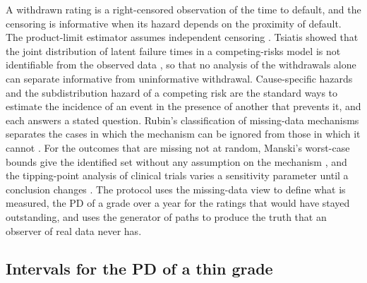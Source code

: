 A withdrawn rating is a right-censored observation of the time to default, and the censoring is informative when its hazard depends on the proximity of default. The product-limit estimator assumes independent censoring \citep{Kaplan_1958}. Tsiatis showed that the joint distribution of latent failure times in a competing-risks model is not identifiable from the observed data \citep{Tsiatis_1975}, so that no analysis of the withdrawals alone can separate informative from uninformative withdrawal. Cause-specific hazards \citep{Prentice_1978} and the subdistribution hazard of a competing risk \citep{Fine_1999} are the standard ways to estimate the incidence of an event in the presence of another that prevents it, and each answers a stated question. Rubin's classification of missing-data mechanisms separates the cases in which the mechanism can be ignored from those in which it cannot \citep{Rubin_1976,Little_2019}. For the outcomes that are missing not at random, Manski's worst-case bounds give the identified set without any assumption on the mechanism \citep{Manski_1989}, and the tipping-point analysis of clinical trials varies a sensitivity parameter until a conclusion changes \citep{Cro_2020}. The protocol uses the missing-data view to define what is measured, the PD of a grade over a year for the ratings that would have stayed outstanding, and uses the generator of paths to produce the truth that an observer of real data never has. %

\subsection{Intervals for the PD of a thin grade}
\label{sec:rw-intervals}

